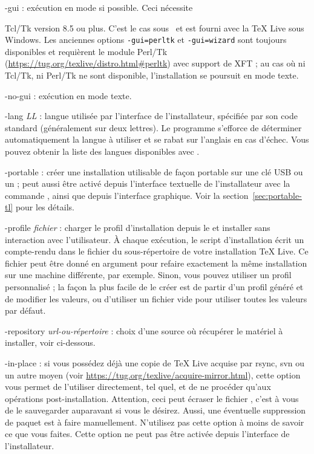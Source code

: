\documentclass[german, english, french]{article}
\renewcommand{\TL}{\TeX{} Live\xspace}%
\begin{document}
\begin{ttdescription}
\item[-gui] : exécution en mode \GUI{} si possible. Ceci nécessite

  Tcl/Tk version 8.5 ou plus. C'est le cas sous \MacOSX\ et est fourni avec la
  \TL{} sous Windows. Les anciennes options \texttt{-gui=perltk} et
  \texttt{-gui=wizard} sont toujours disponibles et requièrent le module Perl/Tk
  (\url{https://tug.org/texlive/distro.html#perltk}) avec support de XFT ; au
  cas où ni Tcl/Tk, ni Perl/Tk ne sont disponible, l'installation se poursuit en
  mode texte.

\item[-no-gui] : exécution en mode texte.

\item[-lang {\sl LL}] : langue utilisée par l'interface de l'installateur,
  spécifiée par son code standard (généralement sur deux lettres).  Le programme
  s'efforce de déterminer automatiquement la langue à utiliser et se rabat sur
  l'anglais en cas d'échec. Vous pouvez obtenir la liste des langues disponibles
  avec .

\item[-portable] : créer une installation utilisable de façon portable sur une
  clé USB ou un \DVD ; peut aussi être activé depuis l'interface textuelle de
  l'installateur avec la commande , ainsi que depuis l'interface
  graphique.  Voir la section~\ref{sec:portable-tl} pour les détails.

\item[-profile {\sl fichier}] : charger le profil d'installation depuis le
   et installer sans interaction avec l'utilisateur.  À chaque
  exécution, le script d'installation écrit un compte-rendu dans le fichier
   du sous-répertoire  de votre
  installation \TL. Ce fichier peut être donné en argument pour refaire
  exactement la même installation sur une machine différente, par
  exemple. Sinon, vous pouvez utiliser un profil personnalisé ; la façon la plus
  facile de le créer est de partir d'un profil généré et de modifier les
  valeurs, ou d'utiliser un fichier vide pour utiliser toutes les valeurs par
  défaut.

\item[-repository {\sl url-ou-répertoire}] : choix d'une source où récupérer le
  matériel à installer, voir ci-dessous.

\item[-in-place] : si vous possédez déjà une copie de \TL{} acquise par rsync,
  svn ou un autre moyen (voir
  \url{https://tug.org/texlive/acquire-mirror.html}), cette option vous permet
  de l'utiliser directement, tel quel, et de ne procéder qu'aux opérations
  post-installation. Attention, ceci peut écraser le fichier
  , c'est à vous de le sauvegarder auparavant si
  vous le désirez. Aussi, une éventuelle suppression de paquet est à faire
  manuellement. N'utilisez pas cette option à moins de savoir ce que vous
  faites. Cette option ne peut pas être activée depuis l'interface de
  l'installateur.
\end{ttdescription}
\end{document}
